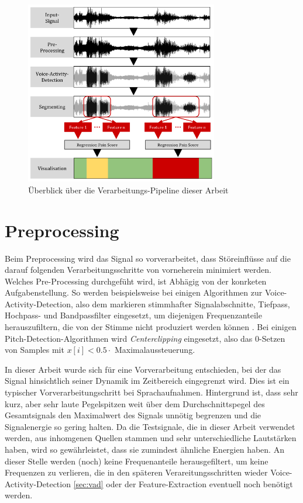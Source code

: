 \begin{figure}[H]
	\centering
	\includegraphics[width=0.75\textwidth]{bilder/pipeline01.png}
	\caption{Überblick über die Verarbeitungs-Pipeline dieser Arbeit}
	\label{img:architecture-overview}
\end{figure}

\section{Preprocessing}
\label{sec:preprocessing}

Beim Preprocessing wird das Signal so vorverarbeitet, dass Störeinflüsse auf die darauf folgenden Verarbeitungsschritte von vorneherein minimiert werden. Welches Pre-Processing durchgefüht wird, ist Abhägig von der konrketen Aufgabenstellung. So werden beispielsweise bei einigen Algorithmen zur Voice-Activity-Detection, also dem markieren stimmhafter Signalabschnitte, Tiefpass, Hochpass- und Bandpassfilter eingesetzt, um diejenigen Frequenzanteile herauszufiltern, die von der Stimme nicht produziert werden können \cite{vad_entropy} \cite{vad_ceps} \cite{vad_kola}. Bei einigen Pitch-Detection-Algorithmen wird \emph{Centerclipping} eingesetzt, also das 0-Setzen von Samples mit $ x[i] < 0.5 \cdot $ Maximalaussteuerung.\cite{czechPitch} 

In dieser Arbeit wurde sich für eine Vorverarbeitung entschieden, bei der das Signal hinsichtlich seiner Dynamik im Zeitbereich eingegrenzt wird. Dies ist ein typischer Vorverarbeitungschritt bei Sprachaufnahmen. Hintergrund ist, dass sehr kurz, aber sehr laute Pegelspitzen weit über dem Durchschnittspegel des Gesamtsignals den Maximalwert des Signals unnötig begrenzen und die Signalenergie so gering halten. Da die Testsignale, die in dieser Arbeit verwendet werden, aus inhomgenen Quellen stammen und sehr unterschiedliche Lautstärken haben, wird so gewährleistet, dass sie zumindest ähnliche Energien haben. An dieser Stelle werden (noch) keine Frequenanteile herausgefiltert, um keine Frequenzen zu verlieren, die in den späteren Verareitungsschritten wieder Voice-Activity-Detection \ref{sec:vad} oder der Feature-Extraction eventuell noch benötigt werden.

